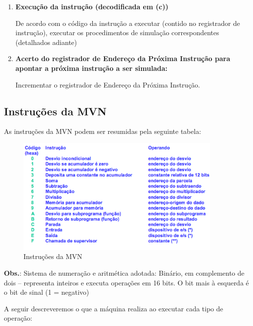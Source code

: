 \begin{enumerate}
\begin{enumerate}
		\begin{enumerate}
			\item \textbf{Execução da instrução (decodificada em (c))}


			De acordo com o código da instrução a executar (contido no registrador de instrução), executar os procedimentos de simulação correspondentes (detalhados adiante)

			\item \textbf{Acerto do registrador de Endereço da Próxima Instrução para apontar a próxima instrução a ser simulada:}

			Incrementar o registrador de Endereço da Próxima Instrução.
		\end{enumerate}

	\end{enumerate}

\end{enumerate}

\subsection{Instruções da MVN}
  \label{chap:inst_mvn}

As instruções da MVN podem ser resumidas pela seguinte tabela:

\begin{figure}[H]
	\centering 
	\includegraphics[width=0.9\textwidth]{img/inst_mvn.png}  
	\caption{Instruções da MVN}
	\label{fig:inst_mvn}
\end{figure}

\textbf{Obs.}: Sistema de numeração e aritmética adotada: Binário, em complemento de dois
– representa inteiros e executa operações em 16 bits. O bit mais à esquerda é o bit de sinal (1 = negativo)


A seguir descreveremos o que a máquina realiza ao executar cada tipo de operação: 



